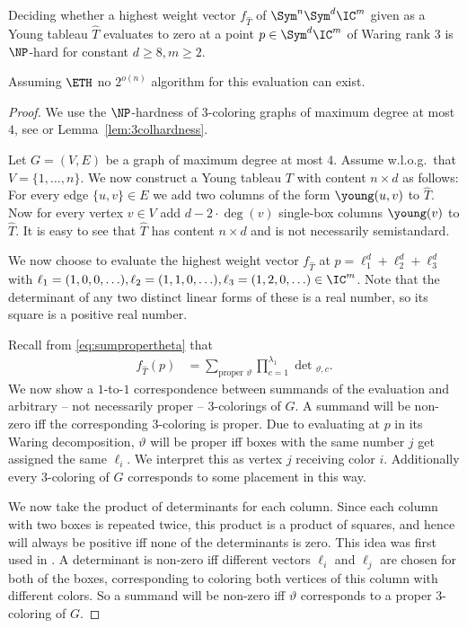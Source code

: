 \begin{theorem}
    \label{thm:evaluationhardness}
    Deciding whether a highest weight vector $f_{\hat{T}}$ of $\Sym^n\Sym^d \IC^m$ given as a Young tableau $\hat{T}$ evaluates to zero at a point $p \in \Sym^d \IC^m$ of Waring rank $3$ is $\NP$-hard for constant $d \geq 8, m \geq 2$.

    Assuming $\ETH$ no $2^{o(n)}$ algorithm for this evaluation can exist.
\end{theorem}
\begin{proof}
    We use the $\NP$-hardness of $3$-coloring graphs of maximum degree at most $4$, see \cite{DBLP:journals/tcs/GareyJS76} or Lemma~\ref{lem:3colhardness}.

    Let $G = (V, E)$ be a graph of maximum degree at most $4$.
    Assume w.l.o.g.\ that $V = \{1, \ldots, n\}$.
    We now construct a Young tableau $T$ with content $n \times d$ as follows:
    For every edge $\{u,v\} \in E$ we add two columns of the form {\scriptsize $\young(u,v)$} to $\hat{T}$.
    Now for every vertex $v \in V$ add $d-2\cdot\deg(v)$ single-box columns {$\young(v)$} to $\hat{T}$.
    It is easy to see that $\hat{T}$ has content $n \times d$ and is not necessarily semistandard.

    We now choose to evaluate the highest weight vector $f_{\hat{T}}$ at $p = \ell_1^d + \ell_2^d + \ell_3^d$ with $\ell_1 = (1, 0, 0, \ldots), \ell_2 = (1, 1, 0, \ldots), \ell_3 = (1, 2, 0, \ldots) \in \IC^m$.
    Note that the determinant of any two distinct linear forms of these is a real number, so its square is a positive real number.

    Recall from \eqref{eq:sumpropertheta} that
\begin{align*}
    f_{\hat{T}}(p) &= \sum_{\text{proper\ }\vartheta} \prod_{c = 1}^{\lambda_1}\det{}_{\vartheta,c}.
\end{align*}
    We now show a $1$-to-$1$ correspondence between summands of the evaluation and arbitrary -- not necessarily proper -- $3$-colorings of $G$.
    A summand will be non-zero iff the corresponding $3$-coloring is proper.
%
    Due to evaluating at $p$ in its Waring decomposition, $\vartheta$ will be proper iff boxes with the same number $j$ get assigned the same $\ell_i$.
    We interpret this as vertex $j$ receiving color $i$.
    Additionally every $3$-coloring of $G$ corresponds to some placement in this way.

    We now take the product of determinants for each column.
    Since each column with two boxes is repeated twice, this product is a product of squares, and hence will always be positive iff none of the determinants is zero. This idea was first used in \cite{bci:10}.
    A determinant is non-zero iff different vectors $\ell_i$ and $\ell_j$ are chosen for both of the boxes, corresponding to coloring both vertices of this column with different colors.
    So a summand will be non-zero iff $\vartheta$ corresponds to a proper $3$-coloring of $G$.


\end{proof}

